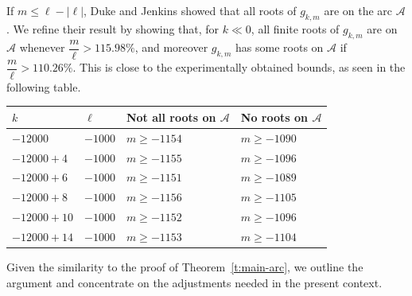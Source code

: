 \documentclass[12pt]{amsart}
\theoremstyle{plain} %
\theoremstyle{definition}
\theoremstyle{remark}
\numberwithin{equation}{section}
\newcommand{\w}{\operatorname{w}}
\newcommand{\Z}{\mathbb Z}
\newcommand{\SL}{\operatorname{SL}}
\begin{document}





If $m\le \ell-|\ell|$, Duke and Jenkins \cite{duke-jenkins} showed that all roots of
$g_{k,m}$ are on the arc $\mathcal{A}$. We refine their result by showing that, for $k\ll 0$, all finite roots of $g_{k,m}$ are
on $\mathcal{A}$ whenever $\dfrac{m}{\ell}>115.98\%$, and moreover $g_{k,m}$
has some roots on $\mathcal{A}$ if $\dfrac{m}{\ell}>110.26\%$. This
is close to the experimentally obtained bounds, as seen in the following table. 
\begin{center}
\begin{tabular}{llll}
$k$ & $\ell$ & Not all roots on $\mathcal{A}$ & No roots on
                                 $\mathcal{A}$\\
  \hline
  $-12000$ & $-1000$ & $m\geq -1154$ & $m\geq -1090$ \\
  $-12000+4$ & $-1000$ & $m\geq -1155$ & $m\geq -1096$ \\
  $-12000+6$ & $-1000$ & $m\geq -1151$ & $m\geq -1089$ \\
  $-12000+8$ & $-1000$ & $m\geq -1156$ & $m\geq -1105$ \\
  $-12000+10$ & $-1000$ & $m\geq -1152$ & $m\geq -1096$ \\
  $-12000+14$ & $-1000$ & $m\geq -1153$ & $m\geq -1104$
\end{tabular}
\end{center}

Given the similarity to the proof of Theorem~\ref{t:main-arc}, we outline the argument and concentrate on the adjustments needed in the present context. 
\end{document}
